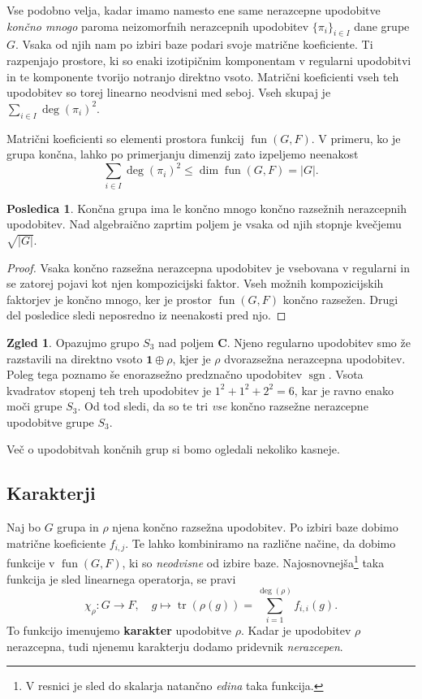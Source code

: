 \documentclass[11pt]{book}
\def\CC{\mathbf{C}}
\def\oneone{\mathbf{1}}
\DeclareMathOperator\sgn{sgn}
\DeclareMathOperator\tr{tr}
\DeclareMathOperator\fun{fun}
\def\definicija{\color{rdeca}\bf}
\theoremstyle{definition}
\theoremstyle{zgled}
\newtheorem{zgled}[theorem]{Zgled}
\theoremstyle{zgledbrezstevilke}
\theoremstyle{odprtproblem}
\theoremstyle{domacanaloga}
\newenvironment{dokaz}
    {\color{siva}\begin{proof}}
    {\end{proof}}
\theoremstyle{izrek}
\newtheorem{posledica}[theorem]{Posledica}
\begin{document}
Vse podobno velja, kadar imamo namesto ene same nerazcepne upodobitve \emph{končno mnogo} paroma neizomorfnih nerazcepnih upodobitev $\{ \pi_i \}_{i \in I}$ dane grupe $G$. Vsaka od njih nam po izbiri baze podari svoje matrične koeficiente. Ti razpenjajo prostore, ki so enaki izotipičnim komponentam v regularni upodobitvi in te komponente tvorijo notranjo direktno vsoto. Matrični koeficienti vseh teh upodobitev so torej linearno neodvisni med seboj. Vseh skupaj je $\sum_{i \in I} \deg(\pi_i)^2$. 

Matrični koeficienti so elementi prostora funkcij $\fun(G,F)$. V primeru, ko je grupa končna, lahko po primerjanju dimenzij zato izpeljemo neenakost
\[
    \sum_{i \in I} \deg(\pi_i)^2 \leq \dim \fun(G,F) = |G|.
\]

\begin{posledica}
Končna grupa ima le končno mnogo končno razsežnih nerazcepnih upodobitev. Nad algebraično zaprtim poljem je vsaka od njih stopnje kvečjemu $\sqrt{|G|}$.
\end{posledica}
\begin{dokaz}
Vsaka končno razsežna nerazcepna upodobitev je vsebovana v regularni in se zatorej pojavi kot njen kompozicijski faktor. Vseh možnih kompozicijskih faktorjev je končno mnogo, ker je prostor $\fun(G,F)$ končno razsežen. Drugi del posledice sledi neposredno iz neenakosti pred njo.
\end{dokaz}

\begin{zgled}
    Opazujmo grupo $S_3$ nad poljem $\CC$. Njeno regularno upodobitev smo že razstavili na direktno vsoto $\oneone \oplus \rho$, kjer je $\rho$ dvorazsežna nerazcepna upodobitev. Poleg tega poznamo še enorazsežno predznačno upodobitev $\sgn$. Vsota kvadratov stopenj teh treh upodobitev je $1^2 + 1^2 + 2^2 = 6$, kar je ravno enako moči grupe $S_3$. Od tod sledi, da so te tri \emph{vse} končno razsežne nerazcepne upodobitve grupe $S_3$.
\end{zgled}

Več o upodobitvah končnih grup si bomo ogledali nekoliko kasneje.

\subsection{Karakterji}

Naj bo $G$ grupa in $\rho$ njena končno razsežna upodobitev. Po izbiri baze dobimo matrične koeficiente $f_{i,j}$. Te lahko kombiniramo na različne načine, da dobimo funkcije v $\fun(G,F)$, ki so \emph{neodvisne} od izbire baze. Najosnovnejša\footnote{V resnici je sled do skalarja natančno \emph{edina} taka funkcija.} taka funkcija je sled linearnega operatorja, se pravi
\[
    \textstyle \chi_{\rho} \colon G \to F, \quad
    g \mapsto \tr(\rho(g)) = \sum_{i = 1}^{\deg(\rho)} f_{i,i}(g).
\]
To funkcijo imenujemo {\definicija karakter} upodobitve $\rho$. Kadar je upodobitev $\rho$ nerazcepna, tudi njenemu karakterju dodamo pridevnik \emph{nerazcepen}. 
\end{document}
